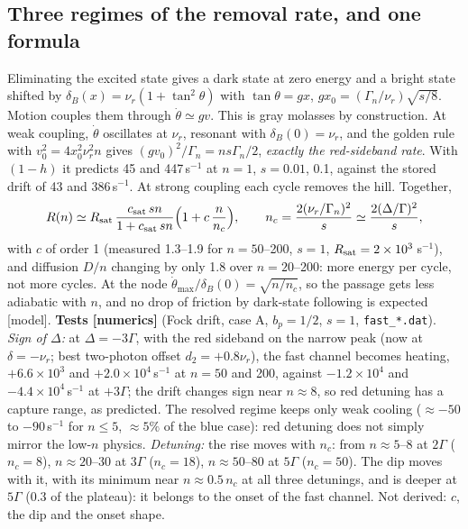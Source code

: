 \documentclass[11pt,a4paper]{article}
\begin{document}
\subsection{Three regimes of the removal rate, and one formula}
\label{sec:regimes}\hypertarget{d:regimes}{}
Eliminating the excited state gives a dark state at zero energy and a bright state shifted by $\delta_B(x)=\nu_r(1+\tan^2\theta)$ with $\tan\theta=gx$, $gx_0=(\Gamma_n/\nu_r)\sqrt{s/8}$. Motion couples them through $\dot\theta\simeq gv$. This is gray molasses by construction. At weak coupling, $\dot\theta$ oscillates at $\nu_r$, resonant with $\delta_B(0)=\nu_r$, and the golden rule with $v_0^2=4x_0^2\nu_r^2n$ gives $(gv_0)^2/\Gamma_n=ns\Gamma_n/2$, \emph{exactly the red-sideband rate}. With $(1-h)$ it predicts 45 and 447\,s$^{-1}$ at $n=1$, $s=0.01$, 0.1, against the stored drift of 43 and 386\,s$^{-1}$. At strong coupling each cycle removes the hill. Together,
\begin{equation}
  R(n)\simeq R_{\rm sat}\,\frac{c_{\rm sat}\,sn}{1+c_{\rm sat}\,sn}\Big(1+c\,\frac{n}{n_c}\Big),\qquad n_c=\frac{2(\nu_r/\Gamma_n)^2}{s}\simeq\frac{2(\Delta/\Gamma)^2}{s},
  \label{eq:Rn}
\end{equation}
with $c$ of order 1 (measured 1.3--1.9 for $n=50$--200, $s=1$, $R_{\rm sat}=2\times10^3\,$s$^{-1}$), and diffusion $D/n$ changing by only 1.8 over $n=20$--200: more energy per cycle, not more cycles. At the node $\dot\theta_{\max}/\delta_B(0)=\sqrt{n/n_c}$, so the passage gets less adiabatic with $n$, and no drop of friction by dark-state following is expected [model]. \textbf{Tests [numerics]} (Fock drift, case A, $b_p=1/2$, $s=1$, \texttt{fast\_*.dat}). \emph{Sign of $\Delta$:} at $\Delta=-3\Gamma$, with the red sideband on the narrow peak (now at $\delta=-\nu_r$; best two-photon offset $d_2=+0.8\nu_r$), the fast channel becomes heating, $+6.6\times10^3$ and $+2.0\times10^4\,$s$^{-1}$ at $n=50$ and 200, against $-1.2\times10^4$ and $-4.4\times10^4\,$s$^{-1}$ at $+3\Gamma$; the drift changes sign near $n\approx8$, so red detuning has a capture range, as predicted. The resolved regime keeps only weak cooling ($\approx-50$ to $-90\,$s$^{-1}$ for $n\le5$, $\approx5\%$ of the blue case): red detuning does not simply mirror the low-$n$ physics. \emph{Detuning:} the rise moves with $n_c$: from $n\approx5$--8 at $2\Gamma$ ($n_c=8$), $n\approx20$--30 at $3\Gamma$ ($n_c=18$), $n\approx50$--80 at $5\Gamma$ ($n_c=50$). The dip moves with it, with its minimum near $n\approx0.5\,n_c$ at all three detunings, and is deeper at $5\Gamma$ (0.3 of the plateau): it belongs to the onset of the fast channel. Not derived: $c$, the dip and the onset shape.
\end{document}
